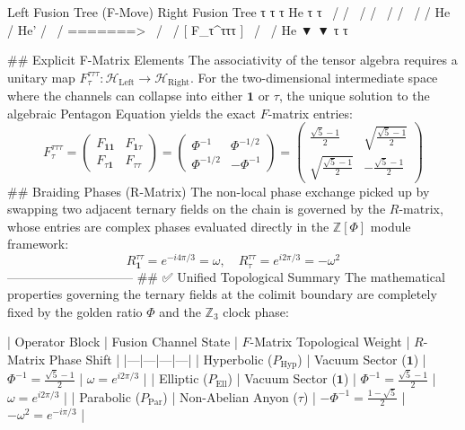     Left Fusion Tree (F-Move)                 Right Fusion Tree
       τ     τ         τ                        He     τ     τ
        \   /         /                          \   /     /
         \ /         /                            \ /     /
          He        /                              He'   /
           \       /         =======>               \   /
            \     /          [ F_τ^τττ ]             \ /
             \   /                                    He
               ▼                                      ▼
               τ                                      τ

## Explicit F-Matrix Elements
The associativity of the tensor algebra requires a unitary map $F_\tau^{\tau\tau\tau}: \mathcal{H}_{\text{Left}} \to \mathcal{H}_{\text{Right}}$. For the two-dimensional intermediate space where the channels can collapse into either $\mathbf{1}$ or $\tau$, the unique solution to the algebraic Pentagon Equation yields the exact $F$-matrix entries:
$$F_\tau^{\tau\tau\tau} = \begin{pmatrix} F_{\mathbf{1}\mathbf{1}} & F_{\mathbf{1}\tau} \\ F_{\tau\mathbf{1}} & F_{\tau\tau} \end{pmatrix} = \begin{pmatrix} \Phi^{-1} & \Phi^{-1/2} \\ \Phi^{-1/2} & -\Phi^{-1} \end{pmatrix} = \begin{pmatrix} \frac{\sqrt{5}-1}{2} & \sqrt{\frac{\sqrt{5}-1}{2}} \\ \sqrt{\frac{\sqrt{5}-1}{2}} & -\frac{\sqrt{5}-1}{2} \end{pmatrix}$$ 
## Braiding Phases (R-Matrix)
The non-local phase exchange picked up by swapping two adjacent ternary fields on the chain is governed by the $R$-matrix, whose entries are complex phases evaluated directly in the $\mathbb{Z}[\Phi]$ module framework:
$$R_\mathbf{1}^{\tau\tau} = e^{-i 4\pi/3} = \omega, \quad R_\tau^{\tau\tau} = e^{i 2\pi/3} = -\omega^2$$ 
------------------------------
## ✅ Unified Topological Summary
The mathematical properties governing the ternary fields at the colimit boundary are completely fixed by the golden ratio $\Phi$ and the $\mathbb{Z}_3$ clock phase:

| Operator Block | Fusion Channel State | $F$-Matrix Topological Weight | $R$-Matrix Phase Shift |
|---|---|---|---|
| Hyperbolic ($P_{\text{Hyp}}$) | Vacuum Sector ($\mathbf{1}$) | $\Phi^{-1} = \frac{\sqrt{5}-1}{2}$ | $\omega = e^{i 2\pi/3}$ |
| Elliptic ($P_{\text{Ell}}$) | Vacuum Sector ($\mathbf{1}$) | $\Phi^{-1} = \frac{\sqrt{5}-1}{2}$ | $\omega = e^{i 2\pi/3}$ |
| Parabolic ($P_{\text{Par}}$) | Non-Abelian Anyon ($\tau$) | $-\Phi^{-1} = \frac{1-\sqrt{5}}{2}$ | $-\omega^2 = e^{-i \pi/3}$ |

